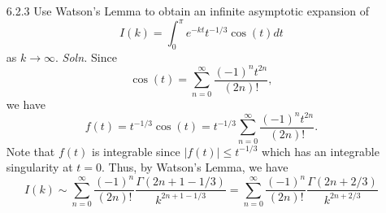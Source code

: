 \documentclass{article}
\begin{document}
\begin{itemize}
    \item[6.2.3] Use Watson's Lemma to obtain an infinite asymptotic expansion of 
    \[I(k) = \int_0^{\pi} e^{-kt}t^{-1/3}\cos(t)dt\]
    as $k \to \infty$.
    \newline\newline
    \textit{Soln.} Since
    \[\cos(t) = \sum_{n = 0}^{\infty}\frac{(-1)^nt^{2n}}{(2n)!},\]
    we have
    \[f(t) = t^{-1/3}\cos(t) = t^{-1/3}\sum_{n = 0}^{\infty}\frac{(-1)^nt^{2n}}{(2n)!}.\]
    Note that $f(t)$ is integrable since $|f(t)| \leq t^{-1/3}$ which has an integrable singularity at $t = 0$. Thus, by Watson's Lemma, we have
    \[I(k) \sim \sum_{n = 0}^{\infty}\frac{(-1)^n}{(2n)!}\frac{\Gamma(2n + 1  - 1/3)}{k^{2n + 1 - 1/3}} = \sum_{n = 0}^{\infty} \frac{(-1)^n}{(2n)!}\frac{\Gamma(2n + 2/3)}{k^{2n + 2/3}}\]

    \pagebreak


\end{itemize}
\end{document}
